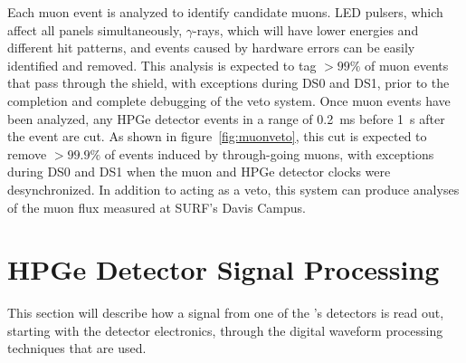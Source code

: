 \documentclass[/main.tex]{subfiles}
\begin{document}
Each muon event is analyzed to identify candidate muons.
LED pulsers, which affect all panels simultaneously, $\gamma$-rays, which will have lower energies and different hit patterns, and events caused by hardware errors can be easily identified and removed.
This analysis is expected to tag $>99\%$ of muon events that pass through the shield, with exceptions during DS0 and DS1, prior to the completion and complete debugging of the veto system.
Once muon events have been analyzed, any HPGe detector events in a range of 0.2~ms before 1~s after the event are cut.
As shown in figure~\ref{fig:muonveto}, this cut is expected to remove $>99.9\%$ of events induced by through-going muons, with exceptions during DS0 and DS1 when the muon and HPGe detector clocks were desynchronized.
In addition to acting as a veto, this system can produce analyses of the muon flux measured at SURF's Davis Campus\cite{mjdmuonflux}.
\\
\section{HPGe Detector Signal Processing}
This section will describe how a signal from one of the \MJD's detectors is read out, starting with the detector electronics, through the digital waveform processing techniques that are used.
\\
\end{document}
